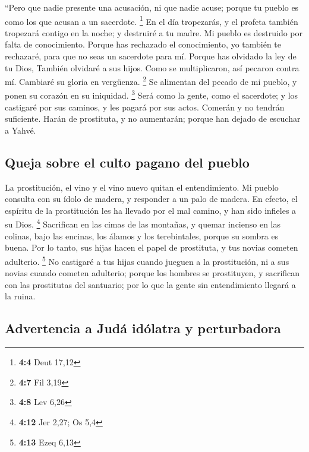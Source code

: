 ``Pero que nadie presente una acusación, ni que nadie
acuse; porque tu pueblo es como los que acusan a un sacerdote.
\footnote{\textbf{4:4} Deut 17,12}  En el día tropezarás,
y el profeta también tropezará contigo en la noche; y destruiré a tu
madre.  Mi pueblo es destruido por falta de conocimiento.
Porque has rechazado el conocimiento, yo también te rechazaré, para que
no seas un sacerdote para mí. Porque has olvidado la ley de tu Dios,
También olvidaré a sus hijos.  Como se multiplicaron, así
pecaron contra mí. Cambiaré su gloria en vergüenza. \footnote{\textbf{4:7}
  Fil 3,19}  Se alimentan del pecado de mi pueblo, y ponen
su corazón en su iniquidad. \footnote{\textbf{4:8} Lev 6,26}
 Será como la gente, como el sacerdote; y los castigaré
por sus caminos, y les pagará por sus actos.  Comerán y
no tendrán suficiente. Harán de prostituta, y no aumentarán; porque han
dejado de escuchar a Yahvé.

\hypertarget{queja-sobre-el-culto-pagano-del-pueblo}{%
\subsection{Queja sobre el culto pagano del
pueblo}\label{queja-sobre-el-culto-pagano-del-pueblo}}

 La prostitución, el vino y el vino nuevo quitan el
entendimiento.  Mi pueblo consulta con su ídolo de
madera, y responder a un palo de madera. En efecto, el espíritu de la
prostitución les ha llevado por el mal camino, y han sido infieles a su
Dios. \footnote{\textbf{4:12} Jer 2,27; Os 5,4} 
Sacrifican en las cimas de las montañas, y quemar incienso en las
colinas, bajo las encinas, los álamos y los terebintales, porque su
sombra es buena. Por lo tanto, sus hijas hacen el papel de prostituta, y
tus novias cometen adulterio. \footnote{\textbf{4:13} Ezeq 6,13}
 No castigaré a tus hijas cuando jueguen a la
prostitución, ni a sus novias cuando cometen adulterio; porque los
hombres se prostituyen, y sacrifican con las prostitutas del santuario;
por lo que la gente sin entendimiento llegará a la ruina.

\hypertarget{advertencia-a-juduxe1-iduxf3latra-y-perturbadora}{%
\subsection{Advertencia a Judá idólatra y
perturbadora}\label{advertencia-a-juduxe1-iduxf3latra-y-perturbadora}}

